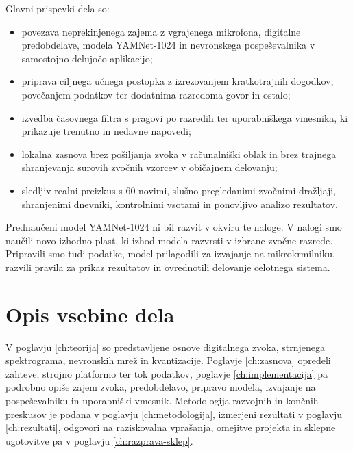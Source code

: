 Glavni prispevki dela so:

\begin{itemize}
  \item povezava neprekinjenega zajema z vgrajenega mikrofona, digitalne
        predobdelave, modela YAMNet-1024 in nevronskega pospeševalnika v
        samostojno delujočo aplikacijo;
  \item priprava ciljnega učnega postopka z izrezovanjem kratkotrajnih dogodkov,
        povečanjem podatkov ter dodatnima razredoma govor in ostalo;
  \item izvedba časovnega filtra s pragovi po razredih ter uporabniškega
        vmesnika, ki prikazuje trenutno in nedavne napovedi;
  \item lokalna zasnova brez pošiljanja zvoka v računalniški oblak in brez
        trajnega shranjevanja surovih zvočnih vzorcev v običajnem delovanju;
  \item sledljiv realni preizkus s 60 novimi, slušno pregledanimi zvočnimi
        dražljaji, shranjenimi dnevniki, kontrolnimi vsotami in ponovljivo
        analizo rezultatov.
\end{itemize}

Prednaučeni model YAMNet-1024 ni bil razvit v okviru te naloge. V nalogi smo
naučili novo izhodno plast, ki izhod modela razvrsti v izbrane zvočne razrede.
Pripravili smo tudi podatke, model prilagodili za izvajanje na mikrokrmilniku,
razvili pravila za prikaz rezultatov in ovrednotili delovanje celotnega sistema.

\section{Opis vsebine dela}

V poglavju \ref{ch:teorija} so predstavljene osnove digitalnega
zvoka, strnjenega spektrograma, nevronskih mrež in kvantizacije. Poglavje
\ref{ch:zasnova} opredeli zahteve, strojno platformo ter tok podatkov, poglavje
\ref{ch:implementacija} pa podrobno opiše zajem zvoka, predobdelavo, pripravo
modela, izvajanje na pospeševalniku in uporabniški vmesnik. Metodologija
razvojnih in končnih preskusov je podana v poglavju \ref{ch:metodologija},
izmerjeni rezultati v poglavju \ref{ch:rezultati}, odgovori na raziskovalna
vprašanja, omejitve projekta in sklepne ugotovitve pa v poglavju
\ref{ch:razprava-sklep}.
